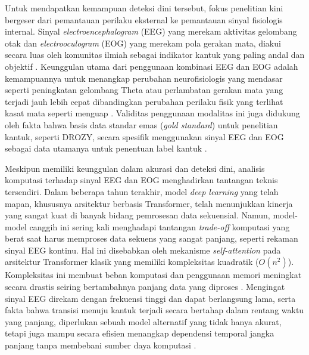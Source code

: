     Untuk mendapatkan kemampuan deteksi dini tersebut, fokus penelitian kini bergeser dari pemantauan perilaku eksternal ke pemantauan sinyal fisiologis internal. Sinyal \textit{electroencephalogram} (EEG) yang merekam aktivitas gelombang otak dan \textit{electrooculogram} (EOG) yang merekam pola gerakan mata, diakui secara luas oleh komunitas ilmiah sebagai indikator kantuk yang paling andal dan objektif \cite{Wang2022}. Keunggulan utama dari penggunaan kombinasi EEG dan EOG adalah kemampuannya untuk menangkap perubahan neurofisiologis yang mendasar seperti peningkatan gelombang Theta atau perlambatan gerakan mata yang terjadi jauh lebih cepat dibandingkan perubahan perilaku fisik yang terlihat kasat mata seperti menguap \cite{Albadawi2022Review}. Validitas penggunaan modalitas ini juga didukung oleh fakta bahwa basis data standar emas (\textit{gold standard}) untuk penelitian kantuk, seperti DROZY, secara spesifik menggunakan sinyal EEG dan EOG sebagai data utamanya untuk penentuan label kantuk \cite{Massoz2016}.

    Meskipun memiliki keunggulan dalam akurasi dan deteksi dini, analisis komputasi terhadap sinyal EEG dan EOG menghadirkan tantangan teknis tersendiri. Dalam beberapa tahun terakhir, model \textit{deep learning} yang telah mapan, khususnya arsitektur berbasis Transformer, telah menunjukkan kinerja yang sangat kuat di banyak bidang pemrosesan data sekuensial. Namun, model-model canggih ini sering kali menghadapi tantangan \textit{trade-off} komputasi yang berat saat harus memproses data sekuens yang sangat panjang, seperti rekaman sinyal EEG kontinu. Hal ini disebabkan oleh mekanisme \textit{self-attention} pada arsitektur Transformer klasik yang memiliki kompleksitas kuadratik ($O(n^{2})$). Kompleksitas ini membuat beban komputasi dan penggunaan memori meningkat secara drastis seiring bertambahnya panjang data yang diproses \cite{Gu2023}. Mengingat sinyal EEG direkam dengan frekuensi tinggi dan dapat berlangsung lama, serta fakta bahwa transisi menuju kantuk terjadi secara bertahap dalam rentang waktu yang panjang, diperlukan sebuah model alternatif yang tidak hanya akurat, tetapi juga mampu secara efisien menangkap dependensi temporal jangka panjang tanpa membebani sumber daya komputasi \cite{Zhou2025}.

